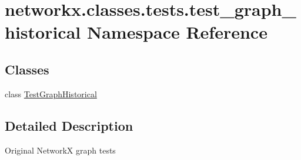 \hypertarget{namespacenetworkx_1_1classes_1_1tests_1_1test__graph__historical}{}\section{networkx.\+classes.\+tests.\+test\+\_\+graph\+\_\+historical Namespace Reference}
\label{namespacenetworkx_1_1classes_1_1tests_1_1test__graph__historical}
\subsection*{Classes}
\begin{DoxyCompactItemize}
\item 
class \hyperlink{classnetworkx_1_1classes_1_1tests_1_1test__graph__historical_1_1TestGraphHistorical}{Test\+Graph\+Historical}
\end{DoxyCompactItemize}


\subsection{Detailed Description}
\begin{DoxyVerb}Original NetworkX graph tests\end{DoxyVerb}
 